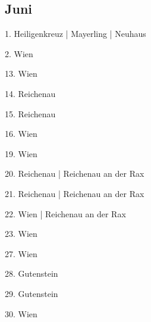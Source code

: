 \documentclass[twoside=false,titlepage=false,open=any, parskip=never, fontsize=10pt, headings=small, chapterprefix=false, appendixprefix=false, DIV=15]{scrbook}
\begin{document}
\begin{multicols}{3}
            \section*{Juni}
            1. Heiligenkreuz | Mayerling | Neuhaus\par
            2. Wien\par
            13. Wien\par
            14. Reichenau\par
            15. Reichenau\par
            16. Wien\par
            19. Wien\par
            20. Reichenau | Reichenau an der Rax\par
            21. Reichenau | Reichenau an der Rax\par
            22. Wien | Reichenau an der Rax\par
            23. Wien\par
            27. Wien\par
            28. Gutenstein\par
            29. Gutenstein\par
            30. Wien\par

\end{multicols}
\end{document}
